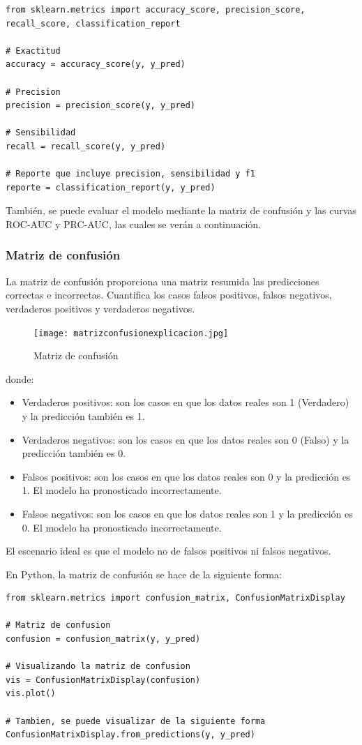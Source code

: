 \documentclass[a4paper, 12pt]{book}
\begin{document}
\begin{verbatim}
from sklearn.metrics import accuracy_score, precision_score, recall_score, classification_report

# Exactitud
accuracy = accuracy_score(y, y_pred)

# Precision
precision = precision_score(y, y_pred)

# Sensibilidad
recall = recall_score(y, y_pred)

# Reporte que incluye precision, sensibilidad y f1
reporte = classification_report(y, y_pred)
\end{verbatim}
También, se puede evaluar el modelo mediante la matriz de confusión y las curvas ROC-AUC y PRC-AUC, las cuales se verán a continuación.

\subsubsection{Matriz de confusión}
La matriz de confusión proporciona una matriz resumida las predicciones correctas e incorrectas. Cuantifica los casos falsos positivos, falsos negativos, verdaderos positivos y verdaderos negativos.
\begin{figure}[H] 
	\centering 
	\texttt{[image: matrizconfusionexplicacion.jpg]}
	\caption{Matriz de confusión}
\end{figure}
donde:
\begin{itemize}
	\item Verdaderos positivos: son los casos en que los datos reales son 1 (Verdadero) y la predicción también es 1.
	\item Verdaderos negativos: son los casos en que los datos reales son 0 (Falso) y la predicción también es 0.
	\item Falsos positivos: son los casos en que los datos reales son 0 y la predicción es 1. El modelo ha pronosticado incorrectamente.
	\item Falsos negativos: son los casos en que los datos reales son 1 y la predicción es 0. El modelo ha pronosticado incorrectamente.
\end{itemize}
El escenario ideal es que el modelo no de falsos positivos ni falsos negativos.

En Python, la matriz de confusión se hace de la siguiente forma:
\begin{verbatim}
from sklearn.metrics import confusion_matrix, ConfusionMatrixDisplay
	
# Matriz de confusion
confusion = confusion_matrix(y, y_pred)
	
# Visualizando la matriz de confusion
vis = ConfusionMatrixDisplay(confusion)
vis.plot()
	
# Tambien, se puede visualizar de la siguiente forma
ConfusionMatrixDisplay.from_predictions(y, y_pred)
\end{verbatim}
\end{document}

